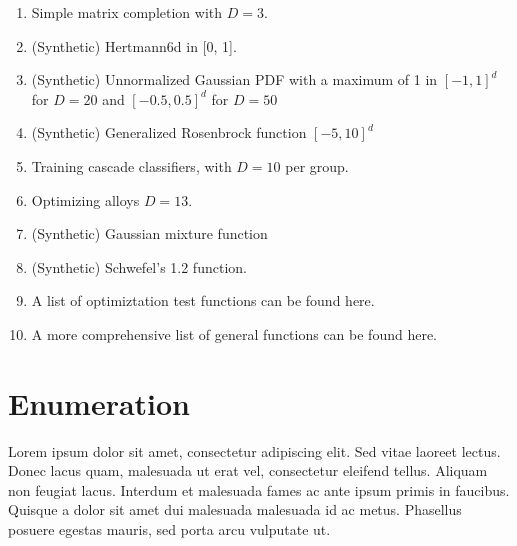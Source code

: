 \begin{enumerate}
\item \citep{Gardner2017} Simple matrix completion with $D=3$.
\item \citep{Rana2017} (Synthetic) Hertmann6d in [0, 1].
\item \citep{Rana2017} (Synthetic) Unnormalized Gaussian PDF with a maximum of 1 in $[-1, 1]^d$ for $D=20$ and $[-0.5, 0.5]^d$ for $D=50$
\item \citep{Rana2017} (Synthetic) Generalized Rosenbrock function $[-5, 10]^d$
\item \citep{Rana2017} Training cascade classifiers, with $D=10$ per group.
\item \citep{Rana2017} Optimizing alloys $D=13$. 
\item \citep{Li2018} (Synthetic) Gaussian mixture function
\item \citep{Li2018} (Synthetic) Schwefel's 1.2 function.
\item \citep{OptimizationTestFunctions} A list of optimiztation test functions can be found here.
\item \citep{Jamil2013} A more comprehensive list of general functions can be found here.
\end{enumerate}

\section*{Enumeration}
Lorem ipsum dolor sit amet, consectetur adipiscing elit. Sed vitae laoreet lectus. Donec lacus quam, malesuada ut erat vel, consectetur eleifend tellus. Aliquam non feugiat lacus. Interdum et malesuada fames ac ante ipsum primis in faucibus. Quisque a dolor sit amet dui malesuada malesuada id ac metus. Phasellus posuere egestas mauris, sed porta arcu vulputate ut.

